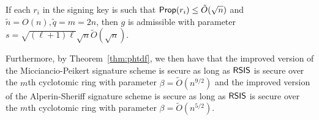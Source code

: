 \begin{lemma}\label{lem:effvalcosting}
If each $r_i$ in the signing key is such that $\mathsf{Prop}(r_i) \leq
\tilde{O}(\sqrt{n})$ and $\tilde{n}=O(n),\tilde{q}=m=2n$, then $g$ is admissible with parameter 
$s=\sqrt{(\ell+1)\ell}\sqrt{n}\tilde{O}(\sqrt{n})$. 

Furthermore, by  Theorem~\ref{thm:phtdf}, we then have that the
improved version of the Micciancio-Peikert signature scheme is secure as long as
$\mathsf{RSIS}$ is secure over the
$m$th cyclotomic ring with parameter
  $\beta=\tilde{O}(n^{9/2})$ and the improved version of the
  Alperin-Sheriff signature scheme is secure as long as $\mathsf{RSIS}$ is
  secure over the $m$th cyclotomic ring with parameter $\beta = \tilde{O}(n^{5/2})$.
\end{lemma}


